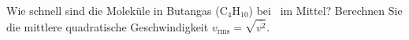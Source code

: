 Wie schnell sind die Moleküle in Butangas ($\mathrm{C_4H_{10}}$) bei \thBO\ im Mittel? Berechnen Sie die mittlere quadratische Geschwindigkeit $v_\text{rms} = \sqrt{\overline{v^2}}$.
